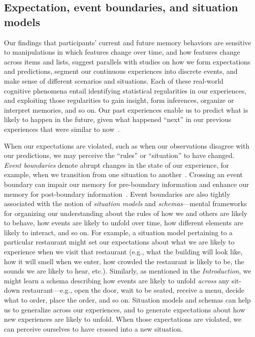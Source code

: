 \documentclass[11pt]{article}
\providecommand{\DIFaddend}{} %
\DeclareRobustCommand{\DIFaddend}{\DIFOaddend \let\includegraphics\DIFOincludegraphics} %
\begin{document}
\DIFaddend \subsection*{Expectation, event boundaries, and situation models}

Our findings that participants' current and future memory behaviors are
sensitive to manipulations in which features change over time, and how features
change across items and lists, suggest parallels with studies on how we form
expectations and predictions, segment our continuous experiences into discrete
events, and make sense of different scenarios and situations. Each of these
real-world cognitive phenomena entail identifying statistical regularities in
our experiences, and exploiting those regularities to gain insight, form
inferences, organize or interpret memories, and so on. Our past experiences
enable us to predict what is likely to happen in the future, given what
happened ``next'' in our previous experiences that were similar to
now~\citep{Mann20, EichFort09, BarrEtal20, Brig12, ChowEtal16, GlucEtal02,
GoldEtal21, GrifStey03, JonePash07, KimEtal14, TamiThor18, XuEtal23}.

When our expectations are violated, such as when our observations disagree with
our predictions, we may perceive the ``rules'' or ``situation'' to have
changed. \textit{Event boundaries} denote abrupt changes in the state of our
experience, for example, when we transition from one situation to
another~\citep{RadvZack17, ZwaaRadv98}. Crossing an event boundary can impair
our memory for pre-boundary information and enhance our memory for
post-boundary information~\citep{RadvCope06, SahaKell02, MannEtal16,
DuBrDava13}. Event boundaries are also tightly associated with the notion of
\textit{situation models} and \textit{schemas}---mental frameworks for
organizing our understanding about the rules of how we and others are likely to
behave, how events are likely to unfold over time, how different elements are
likely to interact, and so on. For example, a situation model pertaining to a
particular restaurant might set our expectations about what we are likely to
experience when we visit that restaurant (e.g., what the building will look
like, how it will smell when we enter, how crowded the restaurant is likely to
be, the sounds we are likely to hear, etc.). Similarly, as mentioned in the
\textit{Introduction}, we might learn a schema describing how events are likely
to unfold \textit{across} any sit-down restaurant---e.g., open the door, wait
to be seated, receive a menu, decide what to order, place the order, and so on.
Situation models and schemas can help us to generalize across our experiences,
and to generate expectations about how new experiences are likely to unfold.
When those expectations are violated, we can perceive ourselves to have crossed
into a new situation.
\end{document}
